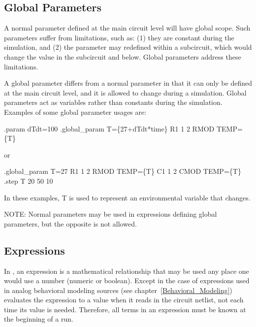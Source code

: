 \subsection{Global Parameters}
 
A normal parameter defined at the main circuit level will have global scope.
Such parameters suffer from limitations, such as: (1) they are constant during the simulation,
and (2) the parameter may redefined within a subcircuit, which would change the value
in the subcircuit and below.  Global parameters address these limitations.

A global parameter differs from a normal parameter in that it can only be defined
at the main circuit level, and it is allowed to change during a simulation.  Global parameters
act as variables rather than constants during the simulation.  Examples of some
global parameter usages are:
  \begin{vquote}
.param dTdt=100
.global_param T=\{27+dTdt*time\}
R1  1  2  RMOD TEMP=\{T\}

or

.global_param T=27
R1  1  2  RMOD TEMP=\{T\}
C1  1  2  CMOD TEMP=\{T\}
.step T 20 50 10
\end{vquote}

In these examples, T is used to represent an environmental variable that changes.

NOTE:	Normal parameters may be used in expressions defining global parameters, but the opposite is not allowed.

\subsection{Expressions}

In \Xyce{}, an expression is a mathematical relationship that may be
used any place one would use a number (numeric or boolean).  Except in
the case of expressions used in analog behavioral modeling sources
(see chapter~\ref{Behavioral_Modeling}) \Xyce{} evaluates the
expression to a value when it reads in the circuit netlist, not each
time its value is needed. Therefore, all terms in an expression must be known at the beginning of a run.

